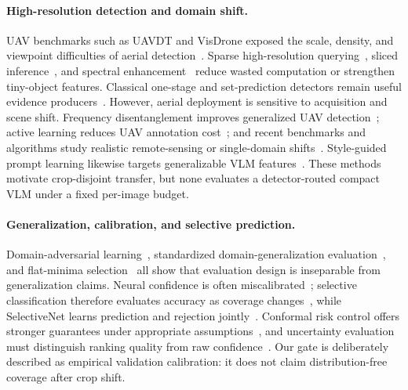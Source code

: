 \paragraph{High-resolution detection and domain shift.}
UAV benchmarks such as UAVDT and VisDrone exposed the scale, density, and viewpoint difficulties of aerial detection~\cite{du2018uavdt,zhu2018visdrone}. Sparse high-resolution querying~\cite{yang2022querydet}, sliced inference~\cite{akyon2022sahi}, and spectral enhancement~\cite{sun2025set} reduce wasted computation or strengthen tiny-object features. Classical one-stage and set-prediction detectors remain useful evidence producers~\cite{redmon2016yolo,carion2020detr}. However, aerial deployment is sensitive to acquisition and scene shift. Frequency disentanglement improves generalized UAV detection~\cite{wang2023uav}; active learning reduces UAV annotation cost~\cite{yamani2024activeuav}; and recent benchmarks and algorithms study realistic remote-sensing or single-domain shifts~\cite{alemadi2025shift,danish2024dg,zhang2024csu}. Style-guided prompt learning likewise targets generalizable VLM features~\cite{talemi2025stylepro}. These methods motivate crop-disjoint transfer, but none evaluates a detector-routed compact VLM under a fixed per-image budget.

\paragraph{Generalization, calibration, and selective prediction.}
Domain-adversarial learning~\cite{ganin2016dann}, standardized domain-generalization evaluation~\cite{gulrajani2021domainbed}, and flat-minima selection~\cite{cha2021swad} all show that evaluation design is inseparable from generalization claims. Neural confidence is often miscalibrated~\cite{guo2017calibration}; selective classification therefore evaluates accuracy as coverage changes~\cite{geifman2017selective}, while SelectiveNet learns prediction and rejection jointly~\cite{geifman2019selectivenet}. Conformal risk control offers stronger guarantees under appropriate assumptions~\cite{angelopoulos2024crc}, and uncertainty evaluation must distinguish ranking quality from raw confidence~\cite{ding2020uncertainty}. Our gate is deliberately described as empirical validation calibration: it does not claim distribution-free coverage after crop shift.

